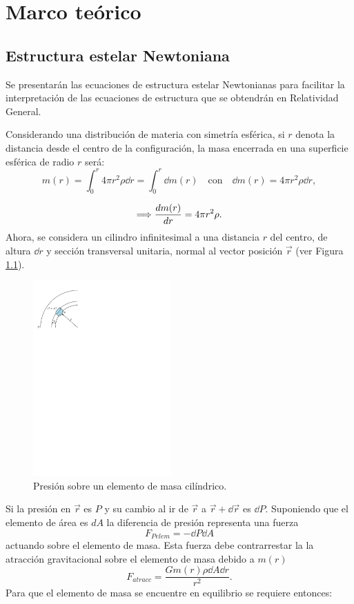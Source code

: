 \chapter{Marco teórico}

\section{Estructura estelar Newtoniana}
Se presentarán las ecuaciones de estructura estelar Newtonianas para facilitar la interpretación de las ecuaciones de estructura que se obtendrán en Relatividad General.

Considerando una distribución de materia con simetría esférica, si $r$ denota la distancia desde el centro de la configuración, la masa encerrada en una superficie esférica de radio $r$ será:  
\begin{equation}
    m ( r ) = \int _ { 0 } ^ { r } 4 \pi r ^ { 2 } \rho \dd{r} = \int_{0}^{r} \dd{m(r)} \quad\text{con}\quad \dd{m(r)}=4\pi r^2\rho \dd{r},
    \label{mN}
\end{equation}

\begin{equation}
    \Longrightarrow\dv{m(r)}{r} =4\pi r^2 \rho.
    \label{dmnewton}
\end{equation}
Ahora, se considera un cilindro infinitesimal a una distancia $r$ del centro, de altura $\dd{r}$ y sección transversal unitaria, normal al vector posición $\vec{r}$ (ver Figura \ref{stellnew}).  

\begin{figure}[H]
    \centering
    \includegraphics[width=150pt]{figures/stellarnewton.pdf}
    \caption{Presión sobre un elemento de masa cilíndrico.}
    \label{stellnew}
\end{figure}
Si la presión en $\vec{r}$ es $P$ y su cambio al ir de $\vec{r}$ a $\vec{r}+\dd{\vec{r}}$ es $\dd{P}$. Suponiendo que el elemento de área es $dA$ la diferencia de presión representa una fuerza 
\begin{equation*}
    F_{Pelem}=-\dd{P}\dd{A}
\end{equation*}
actuando sobre el elemento de masa. Esta fuerza debe contrarrestar la la atracción gravitacional sobre el elemento de masa debido a $m(r)$
\begin{equation*}
    F_{atracc}=\frac{G m(r)\rho \dd{A} \dd{r}}{r^2}.
\end{equation*}
Para que el elemento de masa se encuentre en equilibrio se requiere entonces:

